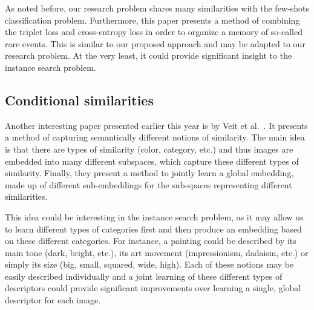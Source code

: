 As noted before, our research problem shares many similarities with the
few-shots classification problem. Furthermore, this paper presents a
method of combining the triplet loss and cross-entropy loss in order to
organize a memory of so-called rare events. This is similar to our proposed
approach and may be adapted to our research problem. At the very least,
it could provide significant insight to the instance search problem.

\subsection{Conditional similarities}
Another interesting paper presented earlier this year is by
Veit et al.~\cite{veit_conditional_2016}. It presents a method of
capturing semantically different notions of similarity. The main idea
is that there are types of similarity (color, category, etc.) and
thus images are embedded into many different subspaces, which capture
these different types of similarity. Finally, they present a method
to jointly learn a global embedding, made up of different sub-embeddings
for the sub-spaces representing different similarities.

This idea could be interesting in the instance search problem, as it
may allow us to learn different types of categories first and then produce
an embedding based on these different categories. For instance, a painting
could be described by its main tone (dark, bright, etc.), its art movement
(impressionism, dadaism, etc.) or simply its size (big, small, squared,
wide, high). Each of these notions may be easily described individually
and a joint learning of these different types of descriptors could provide
significant improvements over learning a single, global descriptor for
each image.
